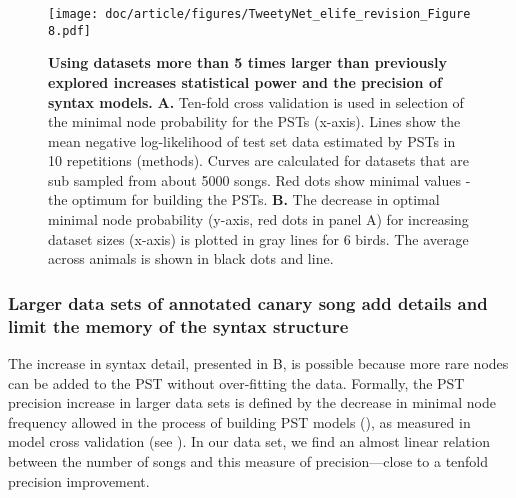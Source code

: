 \documentclass[9pt,lineno]{elife}
\begin{document}
\begin{figure}[!ht]
\label{figsupp:sf2}

\end{figure}

\begin{figure}[!ht] %
\texttt{[image: doc/article/figures/TweetyNet\_elife\_revision\_Figure 8.pdf]}
\caption{{\bf Using datasets more than 5 times larger than previously explored increases statistical power and the precision of syntax models.}
\textbf{A.} Ten-fold cross validation is used in selection of the minimal node probability for the PSTs (x-axis). Lines show the mean negative log-likelihood of test set data estimated by PSTs in 10 repetitions (methods). Curves are calculated for datasets that are sub sampled from about 5000 songs. Red dots show minimal values - the optimum for building the PSTs.
\textbf{B.} The decrease in optimal minimal node probability (y-axis, red dots in panel A) for increasing dataset sizes (x-axis) is plotted in gray lines for 6 birds. The average across animals is shown in black dots and line.}
\label{fig:precision_in_large_datasets}
\label{figdata:first}
\label{figdata:second}
\label{figdata:third}
\end{figure}

\subsubsection{Larger data sets of annotated canary song add details and limit the memory of the syntax structure}
The increase in syntax detail, presented in B, is possible because more rare nodes can be added to the PST without over-fitting the data. Formally, the PST precision increase in larger data sets is defined by the decrease in minimal node frequency allowed in the process of building PST models (), as measured in model cross validation (see ). In our data set, we find an almost linear relation between the number of songs and this measure of precision---close to a tenfold precision improvement.
\end{document}
